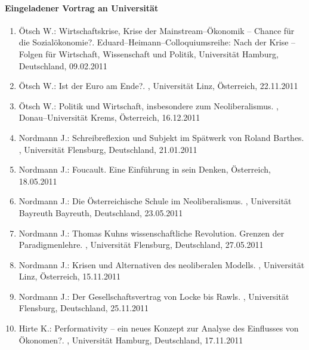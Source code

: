 \paragraph{Eingeladener Vortrag an Universität}
\begin{enumerate}
	\item Ötsch W.: Wirtschaftskrise, Krise der Mainstream--Ökonomik -- Chance für die Sozialökonomie?. Eduard--Heimann--Colloquiumsreihe: Nach der Krise -- Folgen für Wirtschaft, Wissenschaft und Politik, Universität Hamburg, Deutschland, 09.02.2011
	\item Ötsch W.: Ist der Euro am Ende?. , Universität Linz, Österreich, 22.11.2011
	\item Ötsch W.: Politik und Wirtschaft, insbesondere zum Neoliberalismus. , Donau--Universität Krems, Österreich, 16.12.2011
	\item Nordmann J.: Schreibreflexion und Subjekt im Spätwerk von Roland Barthes. , Universität Flensburg, Deutschland, 21.01.2011
	\item Nordmann J.: Foucault. Eine Einführung in sein Denken, Österreich, 18.05.2011
	\item Nordmann J.: Die Österreichische Schule im Neoliberalismus. , Universität Bayreuth Bayreuth, Deutschland, 23.05.2011
	\item Nordmann J.: Thomas Kuhns wissenschaftliche Revolution. Grenzen der Paradigmenlehre. , Universität Flensburg, Deutschland, 27.05.2011
	\item Nordmann J.: Krisen und Alternativen des neoliberalen Modells. , Universität Linz, Österreich, 15.11.2011
	\item Nordmann J.: Der Gesellschaftsvertrag von Locke bis Rawls. , Universität Flensburg, Deutschland, 25.11.2011
	\item Hirte K.: Performativity -- ein neues Konzept zur Analyse des Einflusses von Ökonomen?. , Universität Hamburg, Deutschland, 17.11.2011
\end{enumerate}
